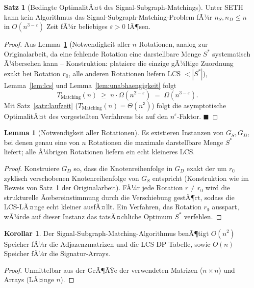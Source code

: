 ﻿\documentclass[a4paper,12pt]{article}
\theoremstyle{definition}
\newtheorem{satz}{Satz}
\newtheorem{lemma}{Lemma}
\newtheorem{korollar}{Korollar}
\begin{document}
\begin{satz}[Bedingte OptimalitÃ¤t des Signal-Subgraph-Matchings]
\label{satz:optimalitaet}
	Unter SETH kann kein Algorithmus das Signal-Subgraph-Matching-Problem fÃ¼r $n_S, n_D \leq n$ in $O(n^{3-\varepsilon})$ Zeit fÃ¼r beliebiges $\varepsilon > 0$ lÃ¶sen.
\end{satz}
\begin{proof}
	Aus Lemma~\ref{lem:rotationen-impl} (Notwendigkeit aller $n$ Rotationen, analog zur Originalarbeit, da eine fehlende Rotation eine darstellbare Menge $S^\ast$ systematisch Ã¼bersehen kann -- Konstruktion: platziere die einzige gÃ¼ltige Zuordnung exakt bei Rotation $r_0$, alle anderen Rotationen liefern LCS $< |S^\ast|$), Lemma~\ref{lem:lcs} und Lemma~\ref{lem:unabhaengigkeit} folgt
	\[
	T_{\text{Matching}}(n) \;\geq\; n \cdot \Omega(n^{2-\varepsilon}) \;=\; \Omega(n^{3-\varepsilon}).
	\]
	Mit Satz~\ref{satz:laufzeit} ($T_{\text{Matching}}(n) = \Theta(n^3)$) folgt die asymptotische OptimalitÃ¤t des vorgestellten Verfahrens bis auf den $n^\varepsilon$-Faktor. $\blacksquare$
\end{proof}

\begin{lemma}[Notwendigkeit aller Rotationen]
\label{lem:rotationen-impl}
	Es existieren Instanzen von $G_S, G_D$, bei denen genau eine von $n$ Rotationen die maximale darstellbare Menge $S^\ast$ liefert; alle Ã¼brigen Rotationen liefern ein echt kleineres LCS.
\end{lemma}
\begin{proof}
	Konstruiere $G_D$ so, dass die Knotenreihenfolge in $G_D$ exakt der um $r_0$ zyklisch verschobenen Knotenreihenfolge von $G_S$ entspricht (Konstruktion wie im Beweis von Satz~1 der Originalarbeit). FÃ¼r jede Rotation $r \neq r_0$ wird die strukturelle Ãœbereinstimmung durch die Verschiebung gestÃ¶rt, sodass die LCS-LÃ¤nge echt kleiner ausfÃ¤llt. Ein Verfahren, das Rotation $r_0$ ausspart, wÃ¼rde auf dieser Instanz das tatsÃ¤chliche Optimum $S^\ast$ verfehlen.
\end{proof}

\begin{korollar}
\label{kor:speicher}
	Der Signal-Subgraph-Matching-Algorithmus benÃ¶tigt $O(n^2)$ Speicher fÃ¼r die Adjazenzmatrizen und die LCS-DP-Tabelle, sowie $O(n)$ Speicher fÃ¼r die Signatur-Arrays.
\end{korollar}
\begin{proof}
	Unmittelbar aus der GrÃ¶ÃŸe der verwendeten Matrizen ($n \times n$) und Arrays (LÃ¤nge $n$).
\end{proof}
\end{document}
